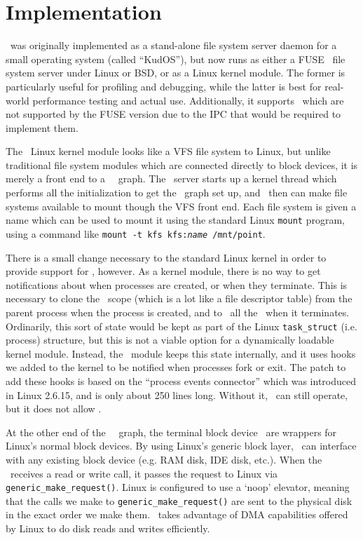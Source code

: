 \section{Implementation}
\label{sec:implementation}

\Kudos\ was originally implemented as a stand-alone file system server daemon
for a small operating system (called ``KudOS''), but now runs as either a
FUSE~\cite{fuse} file system server under Linux or BSD, or as a Linux kernel
module. The former is particularly useful for profiling and debugging, while the
latter is best for real-world performance testing and actual use. Additionally,
it supports \opgroups\ which are not supported by the FUSE version due to the
IPC that would be required to implement them.

The \Kudos\ Linux kernel module looks like a VFS file system to Linux, but
unlike traditional file system modules which are connected directly to block
devices, it is merely a front end to a \Kudos\ \module\ graph. The \Kudos\
server starts up a kernel thread which performs all the initialization to get
the \module\ graph set up, and \modules\ then can make file systems available to
mount though the VFS front end. Each file system is given a name which can be
used to mount it using the standard Linux \texttt{mount} program, using a
command like \mbox{\texttt{mount -t kfs kfs:\textit{name} /mnt/point}}.

There is a small change necessary to the standard Linux kernel in order to
provide support for \opgroups, however. As a kernel module, there is no way to
get notifications about when processes are created, or when they terminate. This
is necessary to clone the \opgroup\ scope (which is a lot like a file descriptor
table) from the parent process when the process is created, and to \abandon\ all
the \opgroups\ when it terminates. Ordinarily, this sort of state would be kept
as part of the Linux \texttt{task\_struct} (i.e. process) structure, but this is
not a viable option for a dynamically loadable kernel module. Instead, the
\Kudos\ module keeps this state internally, and it uses hooks we added to the
kernel to be notified when processes fork or exit. The patch to add these hooks
is based on the ``process events connector'' which was introduced in Linux
2.6.15, and is only about 250 lines long. Without it, \Kudos\ can still operate,
but it does not allow \opgroups.

At the other end of the \Kudos\ \module\ graph, the terminal block device
\modules\ are wrappers for Linux's normal block devices. By using Linux's
generic block layer, \Kudos\ can interface with any existing block device (e.g.
RAM disk, IDE disk, etc.). When the \module\ receives a read or write call, it
passes the request to Linux via \texttt{generic\_make\_request()}. Linux is
configured to use a `noop' elevator, meaning that the calls we make to
\texttt{generic\_make\_request()} are sent to the physical disk in the exact
order we make them. \Kudos\ takes advantage of DMA capabilities offered by
Linux to do disk reads and writes efficiently.

